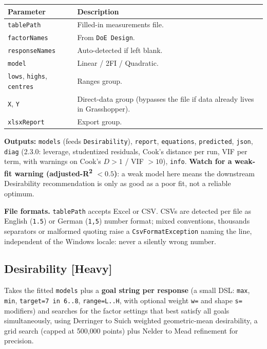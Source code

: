 \documentclass[11pt]{article}
\newcommand{\param}[1]{\texttt{#1}}
\newcommand{\heavy}{\textbf{[Heavy]}}
\begin{document}
\begin{longtable}{@{}p{3.2cm}p{9.3cm}@{}}
\toprule
\textbf{Parameter} & \textbf{Description} \\
\midrule
\endhead
\param{tablePath} & Filled-in measurements file. \\
\param{factorNames} & From \param{DoE Design}. \\
\param{responseNames} & Auto-detected if left blank. \\
\param{model} & Linear / 2FI / Quadratic. \\
\param{lows}, \param{highs}, \param{centres} & Ranges group. \\
\param{X}, \param{Y} & Direct-data group (bypasses the file if data already lives in Grasshopper). \\
\param{xlsxReport} & Export group. \\
\bottomrule
\end{longtable}

\textbf{Outputs:} \param{models} (feeds \param{Desirability}),
\param{report}, \param{equations}, \param{predicted}, \param{json},
\param{diag} (2.3.0: leverage, studentized residuals, Cook's distance
per run, VIF per term, with warnings on Cook's $D > 1$ / VIF $> 10$),
\param{info}. \textbf{Watch for a weak-fit warning (adjusted-R\textsuperscript{2}
$< 0.5$)}: a weak model here means the downstream Desirability
recommendation is only as good as a poor fit, not a reliable optimum.

\textbf{File formats.} \param{tablePath} accepts Excel or CSV. CSVs are
detected per file as English (\texttt{1.5}) or German (\texttt{1,5})
number format; mixed conventions, thousands separators or malformed
quoting raise a \param{CsvFormatException} naming the line, independent
of the Windows locale: never a silently wrong number.

\subsection{Desirability \heavy{}}

Takes the fitted \param{models} plus a \textbf{goal string per
response} (a small DSL: \texttt{max}, \texttt{min}, \texttt{target=7 in
6..8}, \texttt{range=L..H}, with optional weight \texttt{w=} and shape
\texttt{s=} modifiers) and searches for the factor settings that best
satisfy all goals simultaneously, using Derringer to Suich weighted
geometric-mean desirability, a grid search (capped at 500{,}000 points)
plus Nelder to Mead refinement for precision.
\end{document}
